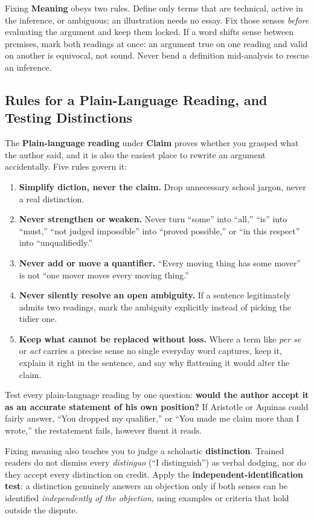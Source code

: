 Fixing \textbf{Meaning} obeys two rules. Define only terms that are technical, active in the inference, or ambiguous; an illustration needs no essay. Fix those senses \emph{before} evaluating the argument and keep them locked. If a word shifts sense between premises, mark both readings at once: an argument true on one reading and valid on another is equivocal, not sound. Never bend a definition mid-analysis to rescue an inference.

\subsection{Rules for a Plain-Language Reading, and Testing Distinctions}

The \textbf{Plain-language reading} under \textbf{Claim} proves whether you grasped what the author said, and it is also the easiest place to rewrite an argument accidentally. Five rules govern it:

\begin{enumerate}
\item \textbf{Simplify diction, never the claim.} Drop unnecessary school jargon, never a real distinction.
\item \textbf{Never strengthen or weaken.} Never turn ``some'' into ``all,'' ``is'' into ``must,'' ``not judged impossible'' into ``proved possible,'' or ``in this respect'' into ``unqualifiedly.''
\item \textbf{Never add or move a quantifier.} ``Every moving thing has some mover'' is not ``one mover moves every moving thing.''
\item \textbf{Never silently resolve an open ambiguity.} If a sentence legitimately admits two readings, mark the ambiguity explicitly instead of picking the tidier one.
\item \textbf{Keep what cannot be replaced without loss.} Where a term like \emph{per se} or \emph{act} carries a precise sense no single everyday word captures, keep it, explain it right in the sentence, and say why flattening it would alter the claim.
\end{enumerate}

Test every plain-language reading by one question: \textbf{would the author accept it as an accurate statement of his own position?} If Aristotle or Aquinas could fairly answer, ``You dropped my qualifier,'' or ``You made me claim more than I wrote,'' the restatement fails, however fluent it reads.

Fixing meaning also teaches you to judge a scholastic \textbf{distinction}. Trained readers do not dismiss every \emph{distinguo} (``I distinguish'') as verbal dodging, nor do they accept every distinction on credit. Apply the \textbf{independent-identification test}: a distinction genuinely answers an objection only if both senses can be identified \emph{independently of the objection}, using examples or criteria that hold outside the dispute.

